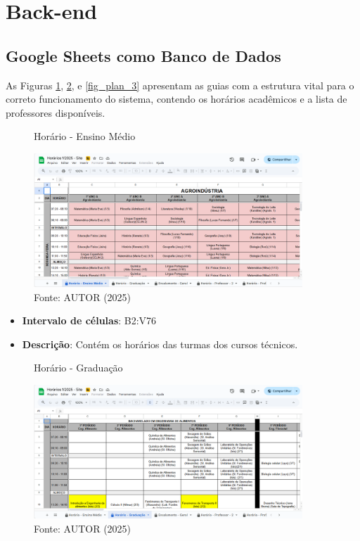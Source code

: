 \section{Back-end}

\subsection{Google Sheets como Banco de Dados}

As Figuras \ref{fig_plan_1}, \ref{fig_plan_2}, e \ref{fig_plan_3} apresentam as guias com a estrutura vital para o correto funcionamento do sistema, contendo os horários acadêmicos e a lista de professores disponíveis.

\begin{figure}[htb]
    \centering
    \caption{Horário - Ensino Médio}
    \includegraphics[width=0.9\textwidth]{Figuras/plan-1.png}
    \caption*{Fonte: AUTOR (2025)}
    \label{fig_plan_1}
\end{figure}

\begin{itemize}
    \item \textbf{Intervalo de células}: B2:V76
    \item \textbf{Descrição}: Contém os horários das turmas dos cursos técnicos.
\end{itemize}

\begin{figure}[htb]
    \centering
    \caption{Horário - Graduação}
    \includegraphics[width=0.9\textwidth]{Figuras/plan-2.png}
    \caption*{Fonte: AUTOR (2025)}
    \label{fig_plan_2}
\end{figure}

